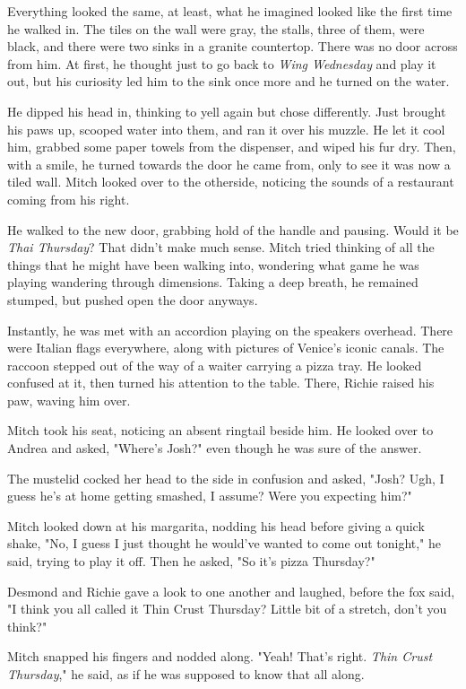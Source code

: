 Everything looked the same, at least, what he imagined looked like the first time he walked in. The tiles on the wall were gray, the stalls, three of them, were black, and there were two sinks in a granite countertop. There was no door across from him. At first, he thought just to go back to \emph{Wing Wednesday} and play it out, but his curiosity led him to the sink once more and he turned on the water.

He dipped his head in, thinking to yell again but chose differently. Just brought his paws up, scooped water into them, and ran it over his muzzle. He let it cool him, grabbed some paper towels from the dispenser, and wiped his fur dry. Then, with a smile, he turned towards the door he came from, only to see it was now a tiled wall. Mitch looked over to the otherside, noticing the sounds of a restaurant coming from his right.

He walked to the new door, grabbing hold of the handle and pausing. Would it be \emph{Thai Thursday}? That didn't make much sense. Mitch tried thinking of all the things that he might have been walking into, wondering what game he was playing wandering through dimensions. Taking a deep breath, he remained stumped, but pushed open the door anyways.

Instantly, he was met with an accordion playing on the speakers overhead. There were Italian flags everywhere, along with pictures of Venice's iconic canals. The raccoon stepped out of the way of a waiter carrying a pizza tray. He looked confused at it, then turned his attention to the table. There, Richie raised his paw, waving him over.

Mitch took his seat, noticing an absent ringtail beside him. He looked over to Andrea and asked, "Where's Josh?" even though he was sure of the answer.

The mustelid cocked her head to the side in confusion and asked, "Josh? Ugh, I guess he's at home getting smashed, I assume? Were you expecting him?"

Mitch looked down at his margarita, nodding his head before giving a quick shake, "No, I guess I just thought he would've wanted to come out tonight," he said, trying to play it off. Then he asked, "So it's pizza Thursday?"

Desmond and Richie gave a look to one another and laughed, before the fox said, "I think you all called it Thin Crust Thursday? Little bit of a stretch, don't you think?"

Mitch snapped his fingers and nodded along. "Yeah! That's right. \emph{Thin Crust Thursday}," he said, as if he was supposed to know that all along.

